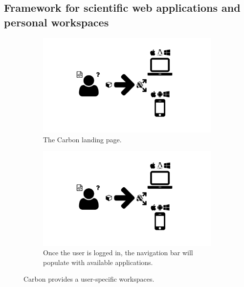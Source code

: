 \subsection{Framework for scientific web applications and personal workspaces}
\begin{figure}
  \centering
  \begin{subfigure}[b]{\textwidth}
    \includegraphics[width=\textwidth,page=9,trim=0.37cm 3.65cm 13.1cm 3.3cm, clip=true]{images/Figures.pdf}
    \caption{The Carbon landing page.}
    \label{Figure:carbon-login-landing}
  \end{subfigure}
  \begin{subfigure}[b]{\textwidth}
    \includegraphics[width=\textwidth,page=9,trim=13.1cm 3.65cm 0.37cm 3.3cm, clip=true]{images/Figures.pdf}
    \caption{Once the user is logged in, the navigation bar will populate with available applications.}
    \label{Figure:carbon-login-logged-in}
  \end{subfigure}
  \caption{Carbon provides a user-specific workspaces.}
  \label{Figure:carbon-login}
\end{figure}

